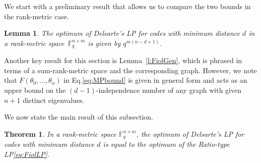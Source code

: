 \documentclass[a4paper]{article}
\newtheorem{lemma}[formula]{Lemma}
\newtheorem{theorem}[formula]{Theorem}
\newcommand{\F}{\mathbb{F}}
\newcommand{\Fq}{\F_q}
\begin{document}
We start with a preliminary result that allows us to compare the two bounds in the rank-metric case.

\begin{lemma}\label{l:DelOpt}\cite[Theorem 5.1.1]{W2022} The optimum of Delsarte's LP for codes with minimum distance $d$ in a rank-metric space~$\Fq^{n \times m}$ is given by $q^{m(n-d+1)}$.
\end{lemma}


Another key result for this section is Lemma~\ref{l:FiolGen}, which is phrased in terms of a sum-rank-metric space and the corresponding graph. However, we note that $F(\theta_0,\dots,\theta_n)$ in Eq.\:\eqref{eq:MPbound} is given in general form and acts as an upper bound on the $(d-1)$-independence number of any graph with given $n+1$ distinct eigenvalues.

We now state the main result of this subsection.

\begin{theorem}\label{thm:equiv_rank}
    In a rank-metric space $\Fq^{n \times m}$, the optimum of Delsarte's LP for codes with minimum distance $d$ is equal to the optimum of the Ratio-type LP\:\eqref{eq:FiolLP}.
\end{theorem}
\end{document}
